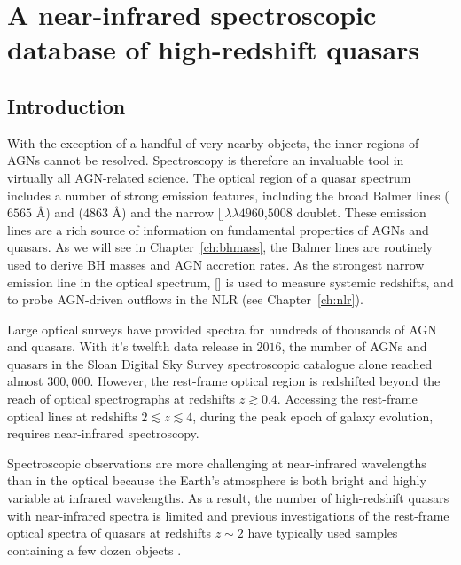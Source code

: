 
\chapter{A near-infrared spectroscopic database of high-redshift quasars}
\label{ch:nirsample}

\section{Introduction}

With the exception of a handful of very nearby objects, the inner regions of AGNs cannot be resolved. 
Spectroscopy is therefore an invaluable tool in virtually all AGN-related science. 
The optical region of a quasar spectrum includes a number of strong emission features, including the broad Balmer lines \ha ($6565$ \AA) and \hb ($4863$ \AA) and the narrow []$\lambda\lambda$$4960$,$5008$ doublet.
These emission lines are a rich source of information on fundamental properties of AGNs and quasars.  
As we will see in Chapter~\ref{ch:bhmass}, the Balmer lines are routinely used to derive BH masses and AGN accretion rates. 
As the strongest narrow emission line in the optical spectrum, [] is used to measure systemic redshifts, and to probe AGN-driven outflows in the NLR (see Chapter~\ref{ch:nlr}). 

Large optical surveys have provided spectra for hundreds of thousands of AGN and quasars. 
With it's twelfth data release in $2016$, the number of AGNs and quasars in the Sloan Digital Sky Survey \citep[SDSS;][]{york00} spectroscopic catalogue alone reached almost $300,000$. 
However, the rest-frame optical region is redshifted beyond the reach of optical spectrographs at redshifts $z \gtrsim0.4$. 
Accessing the rest-frame optical lines at redshifts $2 \lesssim z \lesssim 4$, during the peak epoch of galaxy evolution, requires near-infrared spectroscopy.  

Spectroscopic observations are more challenging at near-infrared wavelengths than in the optical because the Earth's atmosphere is both bright and highly variable at infrared wavelengths. 
As a result, the number of high-redshift quasars with near-infrared spectra is limited and previous investigations of the rest-frame optical spectra of quasars at redshifts $z\sim2$ have typically used samples containing a few dozen objects \citep[e.g.][]{marziani09,shen12,shen16a}. 

